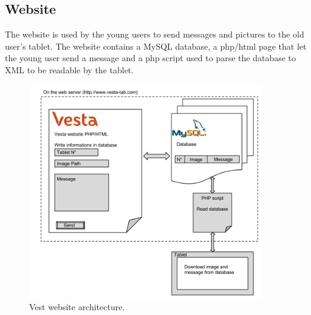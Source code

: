 \subsection{Website}
The website is used by the young users to send messages and pictures to the old user’s tablet.
The website contains a MySQL database, a php/html page that let the young user send a message and a php script used to parse the database to XML to be readable by the tablet.
\begin{figure}[!htb]
    \centering
    \includegraphics[width=0.9\textwidth,keepaspectratio]{chap/softFig/vesta_website2}
    \caption{Vest website architecture.}
    \label{fig:web archi}
\end{figure}

